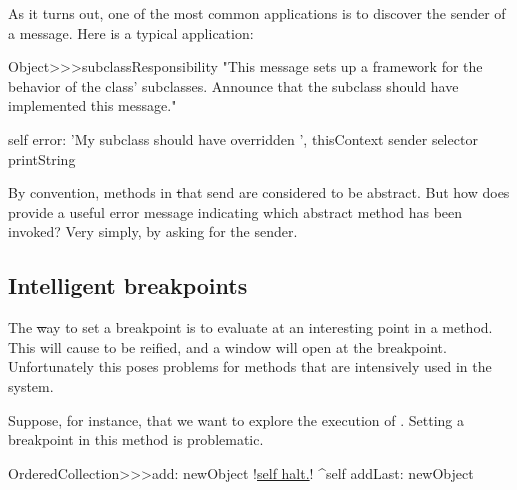 \documentclass[a4paper,10pt,twoside]{book}
\begin{document}
{As it turns out, one of the most common applications is to discover the sender of a message.
Here is a typical application:
\begin{code}{}
Object>>>subclassResponsibility
	"This message sets up a framework for the behavior of the class' subclasses.
	Announce that the subclass should have implemented this message."

	self error: 'My subclass should have overridden ', thisContext sender selector printString
\end{code}

By convention, methods in \st that send  are considered to be abstract.  But how does  provide a useful error message indicating which abstract method has been invoked?  Very simply, by asking  for the sender.

\subsection{Intelligent breakpoints}

The \st way to set a breakpoint is to evaluate  at an interesting point in a method.  This will cause  to be reified, and a  window will open at the breakpoint.
Unfortunately this poses problems for methods that are intensively used in the system.

Suppose, for instance, that we want to explore the execution of .
Setting a breakpoint in this method is problematic.

\begin{code}{}
OrderedCollection>>>add: newObject
	!\underline{self halt.}!
	^self addLast: newObject
\end{code}

}
\end{document}
